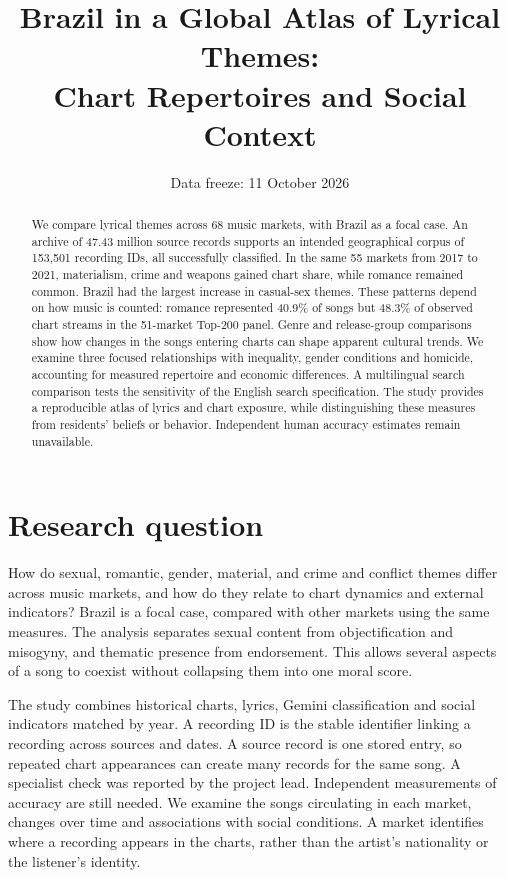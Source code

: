 \documentclass[10pt,a4paper,twocolumn]{article}
\title{\vspace{-8mm}\Large\bfseries Brazil in a Global Atlas of Lyrical Themes:\\Chart Repertoires and Social Context}
\author{}
\date{\vspace{-10mm}\small Data freeze: 11 October 2026}
\begin{document}
\raggedbottom
\maketitle
\begin{abstract}
We compare lyrical themes across 68 music markets, with Brazil as a focal case. An archive of 47.43 million source records supports an intended geographical corpus of 153,501 recording IDs, all successfully classified. In the same 55 markets from 2017 to 2021, materialism, crime and weapons gained chart share, while romance remained common. Brazil had the largest increase in casual-sex themes. These patterns depend on how music is counted: romance represented 40.9\% of songs but 48.3\% of observed chart streams in the 51-market Top-200 panel. Genre and release-group comparisons show how changes in the songs entering charts can shape apparent cultural trends. We examine three focused relationships with inequality, gender conditions and homicide, accounting for measured repertoire and economic differences. A multilingual search comparison tests the sensitivity of the English search specification. The study provides a reproducible atlas of lyrics and chart exposure, while distinguishing these measures from residents' beliefs or behavior. Independent human accuracy estimates remain unavailable.
\end{abstract}

\section{Research question}
How do sexual, romantic, gender, material, and crime and conflict themes differ across music markets, and how do they relate to chart dynamics and external indicators? Brazil is a focal case, compared with other markets using the same measures. The analysis separates sexual content from objectification and misogyny, and thematic presence from endorsement. This allows several aspects of a song to coexist without collapsing them into one moral score.

The study combines historical charts, lyrics, Gemini classification and social indicators matched by year. A recording ID is the stable identifier linking a recording across sources and dates. A source record is one stored entry, so repeated chart appearances can create many records for the same song. A specialist check was reported by the project lead. Independent measurements of accuracy are still needed. We examine the songs circulating in each market, changes over time and associations with social conditions. A market identifies where a recording appears in the charts, rather than the artist's nationality or the listener's identity.
\end{document}
